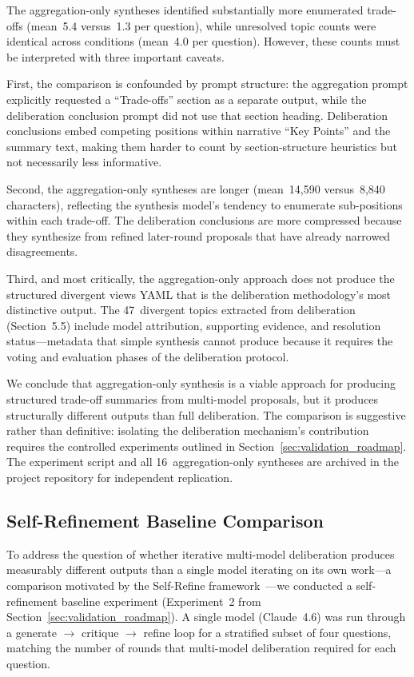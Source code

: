 \documentclass[11pt,a4paper]{article}
\begin{document}
The aggregation-only syntheses identified substantially more enumerated trade-offs (mean~5.4 versus~1.3 per question), while unresolved topic counts were identical across conditions (mean~4.0 per question). However, these counts must be interpreted with three important caveats.

First, the comparison is confounded by prompt structure: the aggregation prompt explicitly requested a ``Trade-offs'' section as a separate output, while the deliberation conclusion prompt did not use that section heading. Deliberation conclusions embed competing positions within narrative ``Key Points'' and the summary text, making them harder to count by section-structure heuristics but not necessarily less informative.

Second, the aggregation-only syntheses are longer (mean~14{,}590 versus~8{,}840 characters), reflecting the synthesis model's tendency to enumerate sub-positions within each trade-off. The deliberation conclusions are more compressed because they synthesize from refined later-round proposals that have already narrowed disagreements.

Third, and most critically, the aggregation-only approach does not produce the structured divergent views YAML that is the deliberation methodology's most distinctive output. The 47~divergent topics extracted from deliberation (Section~5.5) include model attribution, supporting evidence, and resolution status---metadata that simple synthesis cannot produce because it requires the voting and evaluation phases of the deliberation protocol.

We conclude that aggregation-only synthesis is a viable approach for producing structured trade-off summaries from multi-model proposals, but it produces structurally different outputs than full deliberation. The comparison is suggestive rather than definitive: isolating the deliberation mechanism's contribution requires the controlled experiments outlined in Section~\ref{sec:validation_roadmap}. The experiment script and all 16~aggregation-only syntheses are archived in the project repository for independent replication.

\subsection{Self-Refinement Baseline Comparison}
\label{sec:self_refinement}

To address the question of whether iterative multi-model deliberation produces measurably different outputs than a single model iterating on its own work---a comparison motivated by the Self-Refine framework~\cite{madaan2023self}---we conducted a self-refinement baseline experiment (Experiment~2 from Section~\ref{sec:validation_roadmap}). A single model (Claude~4.6) was run through a generate $\rightarrow$ critique $\rightarrow$ refine loop for a stratified subset of four questions, matching the number of rounds that multi-model deliberation required for each question.
\end{document}

